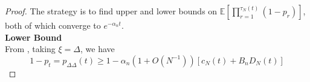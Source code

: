 \documentclass{article}
\newcommand{\E}{\mathbb{E}}
\newcommand{\1}[1]{\mathbbm{1}_{#1}}
\begin{document}
\begin{proof}
%
The strategy is to find upper and lower bounds on $\E\left[ \prod_{r=1}^{\tau_N(t)} (1-p_r) \right]$, both of which converge to $e^{-\alpha_n t}$.\\
\textbf{Lower Bound}\\ %
From \citet[Equation (14)]{brown2020}, taking $\xi=\Delta$, we have
\begin{equation}\label{eq:9a}
1-p_t = p_{\Delta\Delta}(t) \geq 1 - \alpha_n (1+O(N^{-1})) \left[c_N(t) + B_n D_N(t) \right]
\end{equation}

\end{proof}
\end{document}

